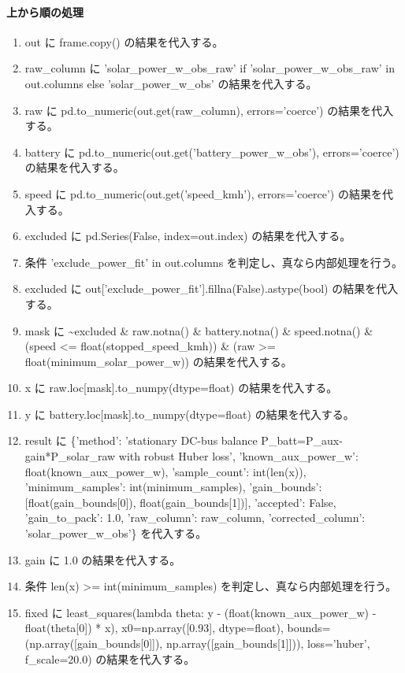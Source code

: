 \documentclass[a4paper,11pt]{article}
\begin{document}
            \paragraph{上から順の処理}
            \begin{enumerate}[leftmargin=1.8em]
            \item out に frame.copy() の結果を代入する。
\item raw\_column に 'solar\_power\_w\_obs\_raw' if 'solar\_power\_w\_obs\_raw' in out.columns else 'solar\_power\_w\_obs' の結果を代入する。
\item raw に pd.to\_numeric(out.get(raw\_column), errors='coerce') の結果を代入する。
\item battery に pd.to\_numeric(out.get('battery\_power\_w\_obs'), errors='coerce') の結果を代入する。
\item speed に pd.to\_numeric(out.get('speed\_kmh'), errors='coerce') の結果を代入する。
\item excluded に pd.Series(False, index=out.index) の結果を代入する。
\item 条件 'exclude\_power\_fit' in out.columns を判定し、真なら内部処理を行う。
\item   excluded に out['exclude\_power\_fit'].fillna(False).astype(bool) の結果を代入する。
\item mask に \textasciitilde{}excluded \& raw.notna() \& battery.notna() \& speed.notna() \& (speed <= float(stopped\_speed\_kmh)) \& (raw >= float(minimum\_solar\_power\_w)) の結果を代入する。
\item x に raw.loc[mask].to\_numpy(dtype=float) の結果を代入する。
\item y に battery.loc[mask].to\_numpy(dtype=float) の結果を代入する。
\item result に \{'method': 'stationary DC-bus balance P\_batt=P\_aux-gain*P\_solar\_raw with robust Huber loss', 'known\_aux\_power\_w': float(known\_aux\_power\_w), 'sample\_count': int(len(x)), 'minimum\_samples': int(minimum\_samples), 'gain\_bounds': [float(gain\_bounds[0]), float(gain\_bounds[1])], 'accepted': False, 'gain\_to\_pack': 1.0, 'raw\_column': raw\_column, 'corrected\_column': 'solar\_power\_w\_obs'\} を代入する。
\item gain に 1.0 の結果を代入する。
\item 条件 len(x) >= int(minimum\_samples) を判定し、真なら内部処理を行う。
\item   fixed に least\_squares(lambda theta: y - (float(known\_aux\_power\_w) - float(theta[0]) * x), x0=np.array([0.93], dtype=float), bounds=(np.array([gain\_bounds[0]]), np.array([gain\_bounds[1]])), loss='huber', f\_scale=20.0) の結果を代入する。

\end{enumerate}
\end{document}
